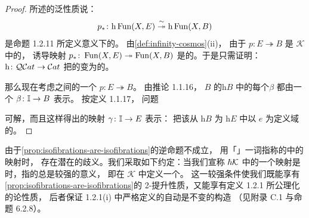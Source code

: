 \begin{proof}
所述的泛性质说：\trFunctor
\begin{equation*}
p_\ast\colon\mathrm{h}\operatorname{Fun}(X,E)\mathrel{\stackrel{\sim}{\twoheadrightarrow}}\mathrm{h}\operatorname{Fun}(X,B)
\end{equation*}
是命题 1.2.11 所定义意义下\trCategory{}的\trIsofibration{}。
由\cref{def:infinity-cosmos}(ii)，
由于 $p\colon E\twoheadrightarrow B$ 是 $\mathcal{K}$ 中的\trIsofibration{}，
诱导映射 $p_\ast\colon\operatorname{Fun}(X,E)\twoheadrightarrow\operatorname{Fun}(X,B)$
是\trQuasiCategory{}的\trIsofibration{}。于是只需证明：
\trFunctor $\mathrm{h}\colon\mathcal{Q}\mathcal{C}at\to\mathcal{C}at$
把\trQuasiCategory{}的\trIsofibration{}变为\trCategory{}的\trIsofibration{}。

那么现在考虑\trQuasiCategory{}之间的一个\trIsofibration{} $p\colon E\twoheadrightarrow B$。
由推论 1.1.16，%
\trQuasiCategory $B$ 的\trHomotopyCategory $\mathrm{h}B$ 中的每个\trIsomorphism $\beta$
都由一个\trSimplicialMap{} $\beta\colon\mathbb{I}\to B$ 表示。
按定义 1.1.17，%
\trLifting{}问题
\begin{center}
\end{center}
可解，而且这样得出的映射 $\gamma\colon\mathbb{I}\to E$ 表示：
把该\trIsomorphism{}从 $\mathrm{h}B$ \trLifting{}为 $\mathrm{h}E$ 中以 $e$ 为定义域的\trIsomorphism{}。
\end{proof}

\begin{convention}\label{conv:isofibration-homotopy-2-category}
由于\cref{prop:isofibrations-are-isofibrations}的逆命题不成立，
用「\trIsofibration」一词指称\trInfinityCosmos{}的\trHomotopyTwoCategory{}中的映射时，
存在潜在的歧义。我们采取如下约定：当我们宣称 $\hbar \mathcal{K}$
中的一个映射是\trIsofibration{}时，指的总是较强的意义，
即在 $\mathcal{K}$ 中定义一个\trIsofibration{}。
这一较强条件使我们既能享有\cref{prop:isofibrations-are-isofibrations}的
2-\trCategory{}提升性质，又能享有定义 1.2.1 所公理化的\trHomotopy{}论性质，
后者保证 1.2.1(i) 中严格定义的\trLimit{}自动是\trEquivalence{}不变的构造
（见附录 C.1 与命题 6.2.8）。%
\end{convention}

